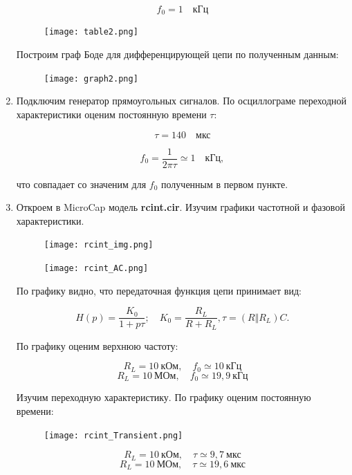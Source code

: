 \documentclass[a4paper, 12pt]{article}%
\begin{document}
\begin{enumerate}
\[f_0 = 1 \quad \textit{кГц}\]

\begin{figure}[h!]
\centering
\texttt{[image: table2.png]}
\label{fig:Image1}
\end{figure}

Построим граф Боде для дифференцирующей цепи по полученным данным:

\begin{figure}[h!]
\centering
\texttt{[image: graph2.png]}
\label{fig:Image1}
\end{figure}

\item Подключим генератор прямоугольных сигналов. По осциллограме переходной характеристики оценим постоянную времени $\tau$:

\[\tau = 140 \quad \textit{мкс}\]

\[f_0 = \frac{1}{2\pi\tau} \simeq 1 \quad \textit{кГц},\]

что совпадает со значеним для $f_0$ полученным в первом пункте.

\item Откроем в MicroCap модель \textbf{rcint.cir}. Изучим графики частотной и фазовой характеристики.

\begin{figure}[h!]
\centering
\texttt{[image: rcint\_img.png]}
\label{fig:Image1}
\end{figure}

\begin{figure}[h!]
\centering
\texttt{[image: rcint\_AC.png]}
\label{fig:Image1}
\end{figure}

По графику видно, что передаточная функция цепи принимает вид:

\[H(p) = \frac{K_0}{1 + p\tau}; \quad K_0 = \frac{R_L}{R + R_L},\tau = (R\Vert R_L) C.\]

По графику оценим верхнюю частоту:

\[R_L = 10 \: \textit{кОм}, \quad f_0 \simeq 10 \: \textit{кГц}\]
\[R_L = 10 \: \textit{МОм}, \quad f_0 \simeq 19,9 \: \textit{кГц}\]

Изучим переходную характеристику. По графику оценим постоянную времени:

\begin{figure}[h!]
\centering
\texttt{[image: rcint\_Transient.png]}
\label{fig:Image1}
\end{figure}

\[R_L = 10 \: \textit{кОм}, \quad \tau \simeq 9,7 \: \textit{мкс}\]
\[R_L = 10 \: \textit{МОм}, \quad \tau \simeq 19,6 \: \textit{мкс}\]


\end{enumerate}
\end{document}
